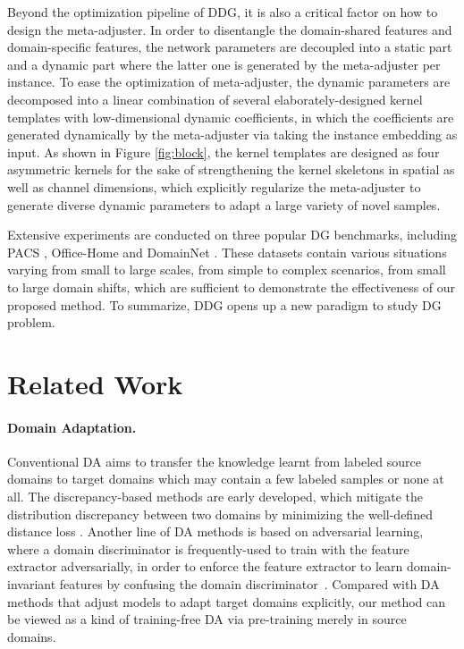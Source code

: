 \documentclass{article}
\begin{document}
Beyond the optimization pipeline of DDG, it is also a critical factor on how to design the meta-adjuster. In order to disentangle the domain-shared features and domain-specific features, the network parameters are decoupled into a static part and a dynamic part where the latter one is generated by the meta-adjuster per instance. To ease the optimization of meta-adjuster, the dynamic parameters are decomposed into a linear combination of several elaborately-designed kernel templates with low-dimensional dynamic coefficients, in which the coefficients are generated dynamically by the meta-adjuster via taking the instance embedding as input. As shown in Figure \ref{fig:block}, the kernel templates are designed as four asymmetric kernels for the sake of strengthening the kernel skeletons in spatial as well as channel dimensions, which explicitly regularize the meta-adjuster to generate diverse dynamic parameters to adapt a large variety of novel samples.

Extensive experiments are conducted on three popular DG benchmarks, including PACS \cite{pacs}, Office-Home \cite{venkateswara2017OfficeHome} and DomainNet \cite{DomainNet}. These datasets contain various situations varying from small to large scales, from simple to complex scenarios, from small to large domain shifts, which are sufficient to demonstrate the effectiveness of our proposed method. To summarize, DDG opens up a new paradigm to study DG problem.


\section{Related Work}
\paragraph{Domain Adaptation.}
Conventional DA aims to transfer the knowledge learnt from labeled source domains to target domains which may contain a few labeled samples or none at all. 
The discrepancy-based methods are early developed, which mitigate the distribution discrepancy between two domains by minimizing the well-defined distance loss \cite{haeusser2017associative}. Another line of DA methods is based on adversarial learning, where a domain discriminator is frequently-used to train with the feature extractor adversarially, in order to enforce the feature extractor to learn domain-invariant features by confusing the domain discriminator~\cite{ganin2016domain}. Compared with DA methods that adjust models to adapt target domains explicitly, our method can be viewed as a kind of training-free DA via pre-training merely in source domains.
\end{document}

